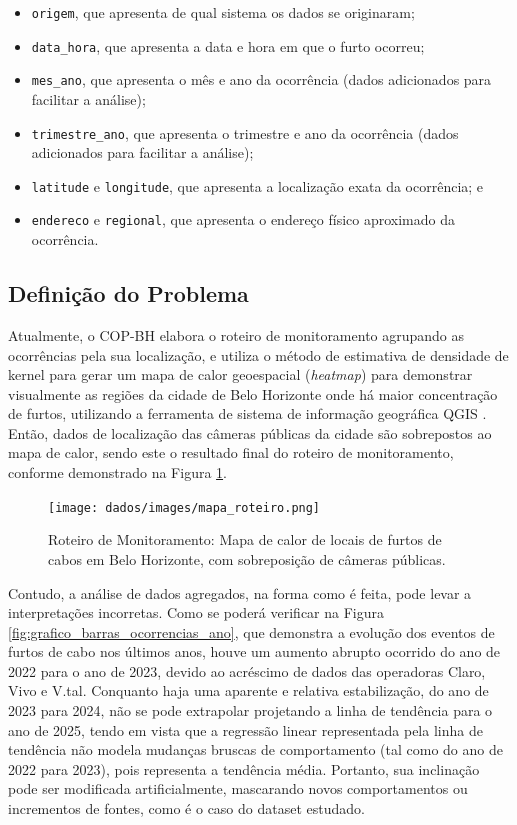 \begin{itemize}
  \item{\texttt{origem}, que apresenta de qual sistema os dados se originaram;}
  \item{\texttt{data\_hora}, que apresenta a data e hora em que o furto ocorreu;}
  \item{\texttt{mes\_ano}, que apresenta o mês e ano da ocorrência (dados adicionados para facilitar a análise);}
  \item{\texttt{trimestre\_ano}, que apresenta o trimestre e ano da ocorrência (dados adicionados para facilitar a análise);}
  \item{\texttt{latitude} e \texttt{longitude}, que apresenta a localização exata da ocorrência; e}
  \item{\texttt{endereco} e \texttt{regional}, que apresenta o endereço físico aproximado da ocorrência.}
\end{itemize}

\subsection{Definição do Problema}

Atualmente, o COP-BH elabora o roteiro de monitoramento agrupando as ocorrências pela sua localização, e utiliza o método de estimativa de densidade de kernel para gerar um mapa de calor geoespacial (\textit{heatmap}) \cite{Wilkinson2009} para demonstrar visualmente as regiões da cidade de Belo Horizonte onde há maior concentração de furtos, utilizando a ferramenta de sistema de informação geográfica QGIS \cite{Qgis}. Então, dados de localização das câmeras públicas da cidade são sobrepostos ao mapa de calor, sendo este o resultado final do roteiro de monitoramento, conforme demonstrado na Figura \ref{fig:mapa_roteiro}.

\begin{figure}[!htb]
  \captionsetup{singlelinecheck=false}
  \centering
  \texttt{[image: dados/images/mapa\_roteiro.png]}
  \caption{Roteiro de Monitoramento: Mapa de calor de locais de furtos de cabos em Belo Horizonte, com sobreposição de câmeras públicas.}
  \label{fig:mapa_roteiro}
\end{figure}

Contudo, a análise de dados agregados, na forma como é feita, pode levar a interpretações incorretas. Como se poderá verificar na Figura \ref{fig:grafico_barras_ocorrencias_ano}, que demonstra a evolução dos eventos de furtos de cabo nos últimos anos, houve um aumento abrupto ocorrido do ano de 2022 para o ano de 2023, devido ao acréscimo de dados das operadoras Claro, Vivo e V.tal. Conquanto haja uma aparente e relativa estabilização, do ano de 2023 para 2024, não se pode extrapolar projetando a linha de tendência para o ano de 2025, tendo em vista que a regressão linear representada pela linha de tendência não modela mudanças bruscas de comportamento (tal como do ano de 2022 para 2023), pois representa a tendência média. Portanto, sua inclinação pode ser modificada artificialmente, mascarando novos comportamentos ou incrementos de fontes, como é o caso do dataset estudado.

